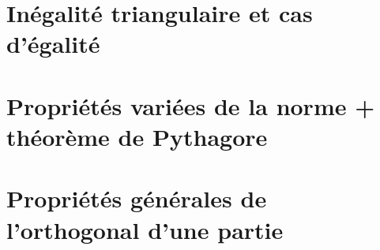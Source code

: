 \documentclass{article}
\begin{document}
\section{Inégalité triangulaire et cas d'égalité}
\section{Propriétés variées de la norme + théorème de Pythagore}
\section{Propriétés générales de l'orthogonal d'une partie}
\end{document}

